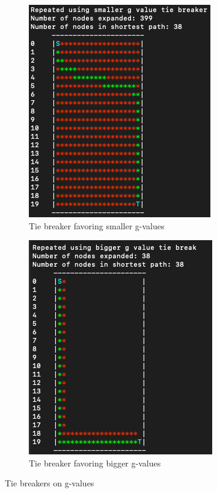 \documentclass{article}
\begin{document}
\begin{enumerate}
\begin{enumerate}
                \begin{figure}[h!]
                    \centering
                    \begin{subfigure}{.4\textwidth}
                        \centering
                        \includegraphics[width=.4\linewidth]{smaller-tie-breaker.png}
                        \caption{Tie breaker favoring smaller g-values}
                        \label{fig:sub1}
                    \end{subfigure}
                    \begin{subfigure}{.4\textwidth}
                        \centering
                        \includegraphics[width=.4\linewidth]{larger-tie-breaker.png}
                        \caption{Tie breaker favoring bigger g-values}
                        \label{fig:sub1}
                    \end{subfigure}
                    \caption{Tie breakers on g-values}
                    \label{tie-breaker}
                \end{figure}
                

\end{enumerate}
\end{enumerate}
\end{document}
